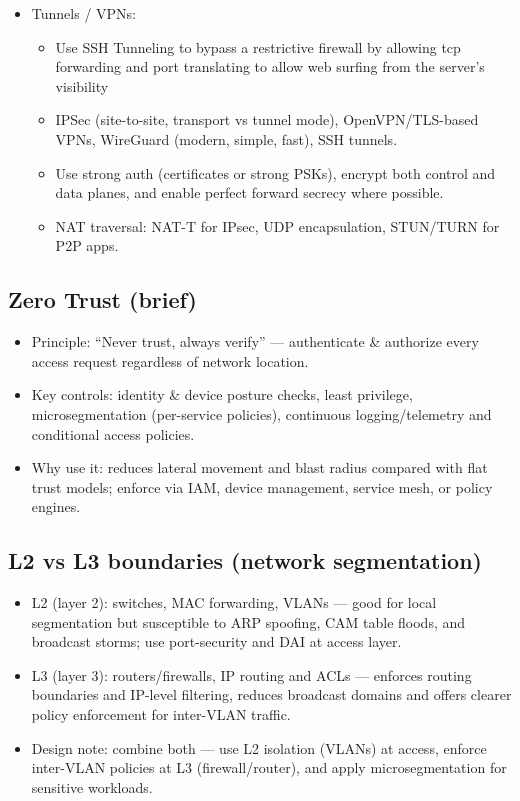\documentclass[12pt]{article}
\begin{document}
\begin{itemize}
\begin{itemize}
\begin{itemize}
        \end{itemize}
    \end{itemize}
  \item Tunnels / VPNs:
    \begin{itemize}
      \item Use SSH Tunneling to bypass a restrictive firewall by allowing tcp forwarding and port translating to allow web surfing from the server's visibility
      \item IPSec (site-to-site, transport vs tunnel mode), OpenVPN/TLS-based VPNs, WireGuard (modern, simple, fast), SSH tunnels.
      \item Use strong auth (certificates or strong PSKs), encrypt both control and data planes, and enable perfect forward secrecy where possible.
      \item NAT traversal: NAT-T for IPsec, UDP encapsulation, STUN/TURN for P2P apps.
    \end{itemize}
\end{itemize}

\subsection{Zero Trust (brief)}
\begin{itemize}
  \item Principle: ``Never trust, always verify'' --- authenticate \& authorize every access request regardless of network location.
  \item Key controls: identity \& device posture checks, least privilege, microsegmentation (per-service policies), continuous logging/telemetry and conditional access policies.
  \item Why use it: reduces lateral movement and blast radius compared with flat trust models; enforce via IAM, device management, service mesh, or policy engines.
\end{itemize}

\subsection{L2 vs L3 boundaries (network segmentation)}
\begin{itemize}
  \item L2 (layer 2): switches, MAC forwarding, VLANs --- good for local segmentation but susceptible to ARP spoofing, CAM table floods, and broadcast storms; use port-security and DAI at access layer.
  \item L3 (layer 3): routers/firewalls, IP routing and ACLs --- enforces routing boundaries and IP-level filtering, reduces broadcast domains and offers clearer policy enforcement for inter-VLAN traffic.
  \item Design note: combine both --- use L2 isolation (VLANs) at access, enforce inter-VLAN policies at L3 (firewall/router), and apply microsegmentation for sensitive workloads.
\end{itemize}
\end{document}
